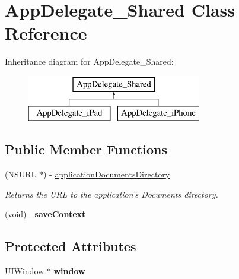 \hypertarget{interface_app_delegate___shared}{
\section{AppDelegate\_\-Shared Class Reference}
\label{interface_app_delegate___shared}
}
Inheritance diagram for AppDelegate\_\-Shared:\begin{figure}[H]
\begin{center}
\leavevmode
\includegraphics[height=2.000000cm]{interface_app_delegate___shared}
\end{center}
\end{figure}
\subsection*{Public Member Functions}
\begin{DoxyCompactItemize}
\item 
\hypertarget{interface_app_delegate___shared_aa783183e1848bbc151a671308c8660c8}{
(NSURL $\ast$) -\/ \hyperlink{interface_app_delegate___shared_aa783183e1848bbc151a671308c8660c8}{applicationDocumentsDirectory}}
\label{interface_app_delegate___shared_aa783183e1848bbc151a671308c8660c8}

\begin{DoxyCompactList}\small\item\em Returns the URL to the application's Documents directory. \end{DoxyCompactList}\item 
\hypertarget{interface_app_delegate___shared_a7ab1af2673c65e59e51d959f7b41cd23}{
(void) -\/ {\bfseries saveContext}}
\label{interface_app_delegate___shared_a7ab1af2673c65e59e51d959f7b41cd23}

\end{DoxyCompactItemize}
\subsection*{Protected Attributes}
\begin{DoxyCompactItemize}
\item 
\hypertarget{interface_app_delegate___shared_a2c178189accdb677c5376d969fed5b7c}{
UIWindow $\ast$ {\bfseries window}}
\label{interface_app_delegate___shared_a2c178189accdb677c5376d969fed5b7c}

\end{DoxyCompactItemize}
